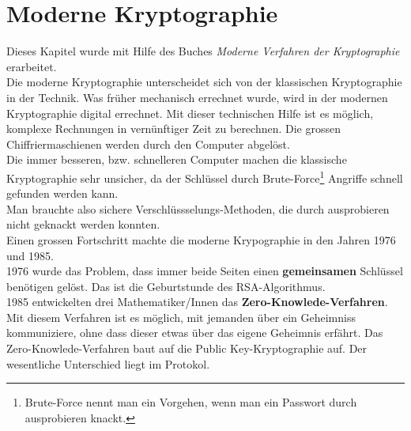 \newpage
\section{Moderne Kryptographie}
Dieses Kapitel wurde mit Hilfe des Buches \textit{Moderne Verfahren der Kryptographie} erarbeitet.\\[2ex]
Die moderne Kryptographie unterscheidet sich von der klassischen Kryptographie in der Technik. Was früher mechanisch errechnet wurde, wird in der modernen Kryptographie digital errechnet. Mit dieser technischen Hilfe ist es möglich, komplexe Rechnungen in vernünftiger Zeit zu berechnen. Die grossen Chiffriermaschienen werden durch den Computer abgelöst.\\
Die immer besseren, bzw. schnelleren Computer machen die klassische Kryptographie sehr unsicher, da der Schlüssel durch Brute-Force\footnote{Brute-Force nennt man ein Vorgehen, wenn man ein Passwort durch ausprobieren knackt.} Angriffe schnell gefunden werden kann.\\
Man brauchte also sichere Verschlüssselungs-Methoden, die durch ausprobieren nicht geknackt werden konnten.\\
Einen grossen Fortschritt machte die moderne Krypographie in den Jahren 1976 und 1985.\\
1976 wurde das Problem, dass immer beide Seiten einen \textbf{gemeinsamen} Schlüssel benötigen gelöst. Das ist die Geburtstunde des RSA-Algorithmus.\\
1985 entwickelten drei Mathematiker/Innen das \textbf{Zero-Knowlede-Verfahren}. Mit diesem Verfahren ist es möglich, mit jemanden über ein Geheimniss kommuniziere, ohne dass dieser etwas über das eigene Geheimnis erfährt. Das Zero-Knowlede-Verfahren baut auf die Public Key-Kryptographie auf. Der wesentliche Unterschied liegt im Protokol.
%
